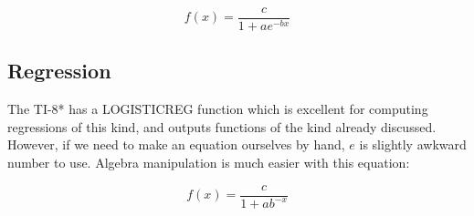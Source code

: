 $$
f(x) = \frac{c}{1+ae^{-bx}}
$$

\subsection{Regression}
The TI-8* has a LOGISTICREG function which is excellent for computing
regressions of this kind, and outputs functions of the kind already discussed.
However, if we need to make an equation ourselves by hand, $e$ is slightly
awkward number to use.  Algebra manipulation is much easier with this
equation:

$$
f(x) = \frac{c}{1+ab^{-x}}
$$
